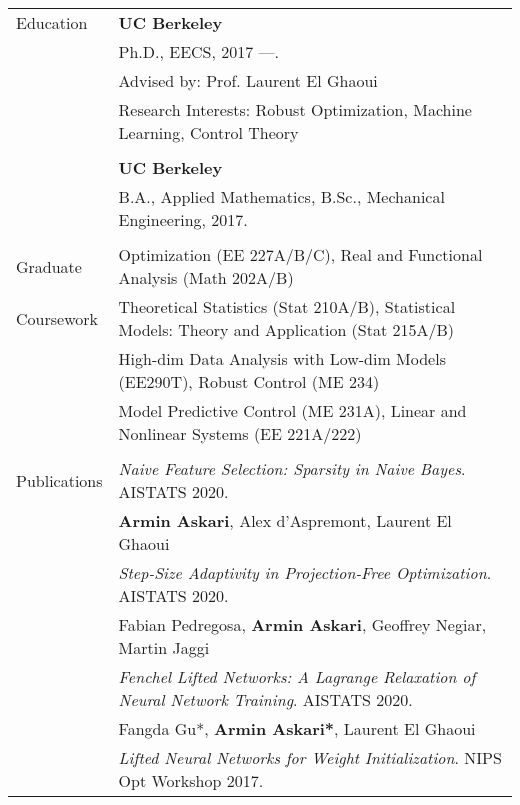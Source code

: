 \documentclass[letterpaper,10pt,oneside]{article}
\begin{document}
\noindent \begin{tabular}{@{} l l}
 \Large{Education}    & \textbf{UC Berkeley} \\
     & Ph.D., EECS, 2017 ---. \\
     & \indent \small{Advised by: Prof. Laurent El Ghaoui}\\
     & \indent Research Interests: Robust Optimization, Machine Learning, Control Theory \\
     & \\
     & \textbf{UC Berkeley} \\
     & B.A., Applied Mathematics, B.Sc., Mechanical Engineering, 2017. \\
     & \\
\Large{Graduate} & Optimization (EE 227A/B/C), Real and Functional Analysis (Math 202A/B)\\
 \Large{Coursework}  & \indent Theoretical Statistics (Stat 210A/B), Statistical Models: Theory and Application (Stat 215A/B) \\
 & \indent High-dim Data Analysis with Low-dim Models (EE290T),   Robust Control (ME 234) \\      
  & \indent Model Predictive Control (ME 231A), Linear and Nonlinear Systems (EE 221A/222)\\
  &\\
     \Large{Publications}  
      &  \textit{Naive Feature Selection: Sparsity in Naive Bayes}. AISTATS 2020. \\
      & \indent \small{\textbf{Armin Askari},  Alex d'Aspremont, Laurent El Ghaoui}\\
      &  \textit{Step-Size Adaptivity in Projection-Free Optimization}. AISTATS 2020. \\
      & \indent \small{Fabian Pedregosa, \textbf{Armin Askari},  Geoffrey Negiar, Martin Jaggi}\\
            &  \textit{Fenchel Lifted Networks: A Lagrange Relaxation of Neural Network Training}. AISTATS 2020. \\
      & \indent  Fangda Gu*, \small{\textbf{Armin Askari*}, Laurent El Ghaoui}\\     
     & \textit{Lifted Neural Networks for Weight Initialization}. NIPS Opt Workshop 2017. \\

\end{tabular}
\end{document}
